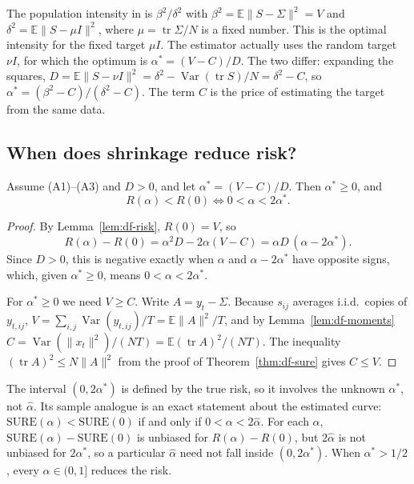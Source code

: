 \begin{remark}
The population intensity in \citet{ledoit2004} is $\beta^2/\delta^2$ with $\beta^2 = \mathbb{E}\|S - \Sigma\|^2 = V$ and $\delta^2 = \mathbb{E}\|S - \mu I\|^2$, where $\mu = \operatorname{tr}\Sigma/N$ is a fixed number. This is the optimal intensity for the fixed target $\mu I$. The estimator actually uses the random target $\nu I$, for which the optimum is $\alpha^* = (V - C)/D$. The two differ: expanding the squares, $D = \mathbb{E}\|S - \nu I\|^2 = \delta^2 - \operatorname{Var}(\operatorname{tr}S)/N = \delta^2 - C$, so $\alpha^* = (\beta^2 - C)/(\delta^2 - C)$. The term $C$ is the price of estimating the target from the same data.
\end{remark}

\subsection{When does shrinkage reduce risk?}

\begin{proposition}\label{prop:df-reduce}
Assume (A1)--(A3) and $D > 0$, and let $\alpha^* = (V - C)/D$. Then $\alpha^* \ge 0$, and
\[
  R(\alpha) < R(0) \iff 0 < \alpha < 2\alpha^* .
\]
\end{proposition}

\begin{proof}
By Lemma~\ref{lem:df-risk}, $R(0) = V$, so
\[
  R(\alpha) - R(0) = \alpha^2 D - 2\alpha(V - C) = \alpha D\,(\alpha - 2\alpha^*).
\]
Since $D > 0$, this is negative exactly when $\alpha$ and $\alpha - 2\alpha^*$ have opposite signs, which, given $\alpha^* \ge 0$, means $0 < \alpha < 2\alpha^*$.

For $\alpha^* \ge 0$ we need $V \ge C$. Write $A = y_t - \Sigma$. Because $s_{ij}$ averages i.i.d.\ copies of $y_{t,ij}$, $V = \sum_{i,j}\operatorname{Var}(y_{t,ij})/T = \mathbb{E}\|A\|^2/T$, and by Lemma~\ref{lem:df-moments} $C = \operatorname{Var}(\|x_t\|^2)/(NT) = \mathbb{E}(\operatorname{tr}A)^2/(NT)$. The inequality $(\operatorname{tr}A)^2 \le N\|A\|^2$ from the proof of Theorem~\ref{thm:df-sure} gives $C \le V$.
\end{proof}

The interval $(0, 2\alpha^*)$ is defined by the true risk, so it involves the unknown $\alpha^*$, not $\hat\alpha$. Its sample analogue is an exact statement about the estimated curve: $\mathrm{SURE}(\alpha) < \mathrm{SURE}(0)$ if and only if $0 < \alpha < 2\hat\alpha$. For each $\alpha$, $\mathrm{SURE}(\alpha) - \mathrm{SURE}(0)$ is unbiased for $R(\alpha) - R(0)$, but $2\hat\alpha$ is not unbiased for $2\alpha^*$, so a particular $\hat\alpha$ need not fall inside $(0, 2\alpha^*)$. When $\alpha^* > 1/2$, every $\alpha \in (0, 1]$ reduces the risk.

